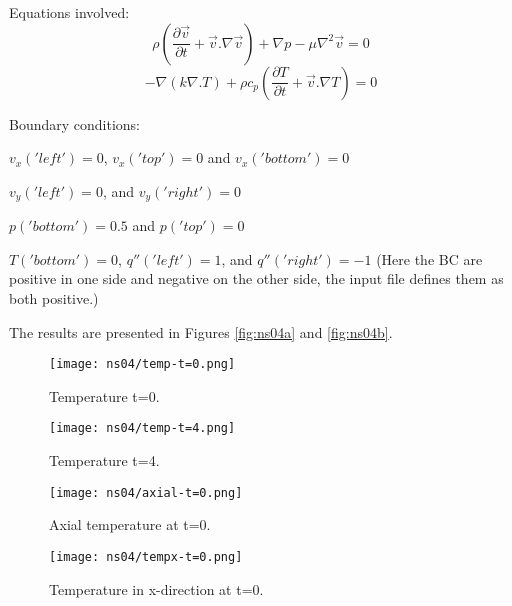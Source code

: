 \documentclass[11pt,letterpaper]{article}
\begin{document}
Equations involved:
\begin{equation}
\rho (\frac{\partial \vec{v}}{\partial t}+\vec{v} . \nabla\vec{v})+\nabla p - \mu \nabla^{2}\vec{v}=0
\end{equation}
\begin{equation}
-\nabla(k \nabla . T)+\rho c_{p}(\frac{\partial T}{\partial t}+\vec{v} . \nabla T)=0
\end{equation}

Boundary conditions:
\begin{description}[]
	\item[] $v_{x}('left')=0$, $v_{x}('top')=0$ and $v_{x}('bottom')=0$
	\item[] $v_{y}('left')=0$, and $v_{y}('right')=0$
	\item[] $p('bottom')=0.5$ and $p('top')=0$
	\item[] $T('bottom')=0$, $q''('left')=1$, and $q''('right')=-1$
	(Here the BC are positive in one side and negative on the other side, the input file defines them as both positive.)
\end{description}

The results are presented in Figures \ref{fig:ns04a} and \ref{fig:ns04b}.
\begin{figure*}[!h]
	\centering
	\begin{subfigure}[t]{0.4\textwidth}
		\centering
		\texttt{[image: ns04/temp-t=0.png]} 
		\caption{Temperature t=0.}
		\label{fig:ns04-temp-t=0}
	\end{subfigure}
	\vspace{1cm}
	\begin{subfigure}[t]{0.4\textwidth}
		\centering
		\texttt{[image: ns04/temp-t=4.png]}
		\caption{Temperature t=4.}
		\label{fig:ns04-temp-t=4}
	\end{subfigure}
	\hfill
	\caption{Temperature.}
	\label{fig:ns04a}
\end{figure*}

\begin{figure*}[!h]
	\centering
	\begin{subfigure}[t]{0.4\textwidth}
		\centering
		\texttt{[image: ns04/axial-t=0.png]} 
		\caption{Axial temperature at t=0.}
		\label{fig:ns04-axial}
	\end{subfigure}
	\vspace{1cm}
	\begin{subfigure}[t]{0.4\textwidth}
		\centering
		\texttt{[image: ns04/tempx-t=0.png]}
		\caption{Temperature in x-direction at t=0.}
		\label{fig:ns04-tempx}
	\end{subfigure}
	\hfill
	\caption{Temperature.}
	\label{fig:ns04b}
\end{figure*}
\end{document}
